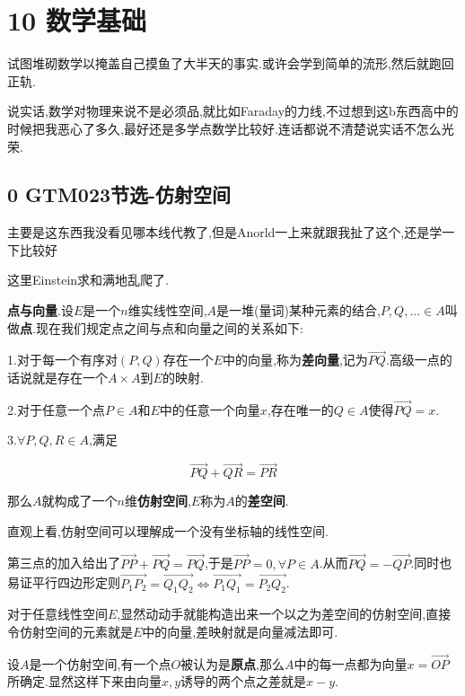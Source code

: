 \documentclass[UTF8]{article}
\begin{document}
	
	
	
\section*{10 数学基础}
	
	试图堆砌数学以掩盖自己摸鱼了大半天的事实.或许会学到简单的流形,然后就跑回正轨.
	
	说实话,数学对物理来说不是必须品,就比如Faraday的力线,不过想到这b东西高中的时候把我恶心了多久,最好还是多学点数学比较好.连话都说不清楚说实话不怎么光荣.
	
\subsection*{0 GTM023\cite{GTM023}节选-仿射空间}
	
	主要是这东西我没看见哪本线代教了,但是Anorld一上来就跟我扯了这个,还是学一下比较好
	
	这里Einstein求和满地乱爬了.
	
	\textbf{点与向量}.设$E$是一个$n$维实线性空间,$A$是一堆(量词)某种元素的结合,$P,Q,...\in A$叫做\textbf{点}.现在我们规定点之间与点和向量之间的关系如下:
	
	1.对于每一个有序对$(P,Q)$存在一个$E$中的向量,称为\textbf{差向量},记为$\overrightarrow{PQ}$.高级一点的话说就是存在一个$A\times A$到$E$的映射.
	
	2.对于任意一个点$P\in A$和$E$中的任意一个向量$x$,存在唯一的$Q\in A$使得$\overrightarrow{PQ}=x$.
	
	3.$\forall P,Q,R\in A$,满足
	
	\[\overrightarrow{PQ}+\overrightarrow{QR}=\overrightarrow{PR}\]
	
	那么$A$就构成了一个$n$维\textbf{仿射空间},$E$称为$A$的\textbf{差空间}.
	
	直观上看,仿射空间可以理解成一个没有坐标轴的线性空间.
	
	第三点的加入给出了$\overrightarrow{PP}+\overrightarrow{PQ}=\overrightarrow{PQ}$,于是$\overrightarrow{PP}=0,\forall P\in A$.从而$\overrightarrow{PQ}=-\overrightarrow{QP}$.同时也易证平行四边形定则$\overrightarrow{P_1P_2}=\overrightarrow{Q_1Q_2}\Leftrightarrow\overrightarrow{P_1Q_1}=\overrightarrow{P_2Q_2}$.
	
	对于任意线性空间$E$,显然动动手就能构造出来一个以之为差空间的仿射空间,直接令仿射空间的元素就是$E$中的向量,差映射就是向量减法即可.
	
	设$A$是一个仿射空间,有一个点$O$被认为是\textbf{原点},那么$A$中的每一点都为向量$x=\overrightarrow{OP}$所确定.显然这样下来由向量$x,y$诱导的两个点之差就是$x-y$.
	
\end{document}
